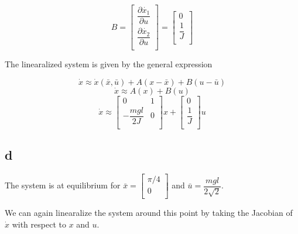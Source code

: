 \documentclass[11pt]{article}
\begin{document}
\[
    B =
    \begin{bmatrix}
        \dfrac{\partial \dot{x_1}}{\partial u} \\
        \dfrac{\partial \dot{x_2}}{\partial u} \\
    \end{bmatrix}
    = \begin{bmatrix}
        0 \\
        \dfrac{1}{J} \\
    \end{bmatrix}
\]

The linearalized system is given by the general expression

\[ \dot{x} \approx \dot{x}(\bar{x}, \bar{u}) + A (x - \bar{x}) + B (u - \bar{u}) \]
\[ \dot{x} \approx A(x) + B (u) \]
\[
    \dot{x} \approx
    \begin{bmatrix}
        0 & 1 \\
        - \dfrac{mgl}{2J} & 0 \\
    \end{bmatrix}
    x +
    \begin{bmatrix}
        0 \\
        \dfrac{1}{J} \\
    \end{bmatrix}
    u
\]

\subsection{d}

The system is at equilibrium for $\bar{x} = \begin{bmatrix} \pi / 4 \\ 0 \\ \end{bmatrix}$ and $\bar{u} = \dfrac{mgl}{2\sqrt{2}}$.

We can again linearalize the system around this point by taking the Jacobian of $\dot{x}$ with respect to $x$ and $u$.
\end{document}
